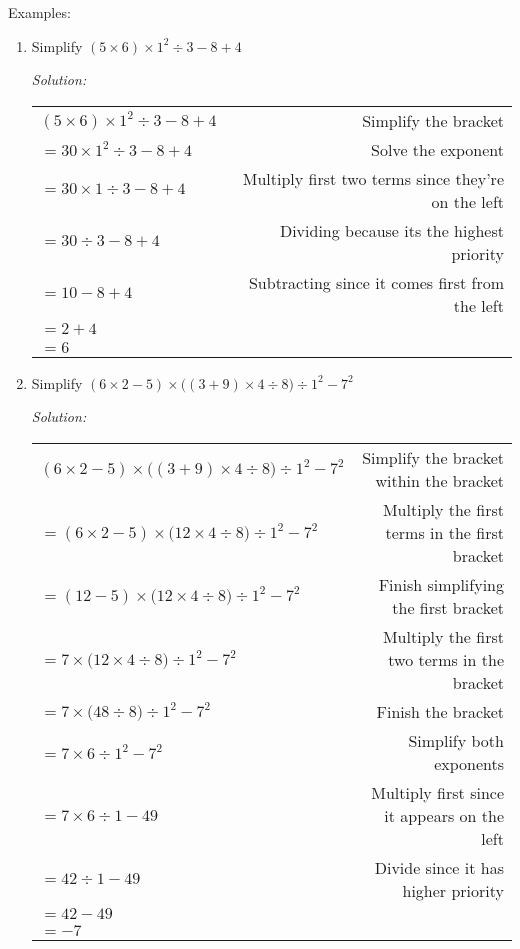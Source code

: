 \documentclass[16pt]{article}
\theoremstyle{remark}
\begin{document}
Examples:
\begin{enumerate}
\item Simplify $(5\times 6)\times1^2 \div3-8+4$
\begin{mdframed}[style=TheoremFrame]
\textit{Solution:}
\begin{center}
\begin{tabular}{l r}
$(5\times 6)\times 1^2 \div 3-8+4$ &  Simplify the bracket\\
$ = 30 \times 1^2 \div 3-8+4$ &  Solve the exponent\\
$= 30 \times1 \div 3-8+4$ &  Multiply first two terms since they're on the left\\
$= 30 \div 3 -8+4$ &  Dividing because its the highest priority \\
$= 10 - 8 + 4$ & Subtracting since it comes first from the left\\
$= 2+4$ & \\
$= 6$ &\\
\end{tabular}
\end{center}

\end{mdframed}
\item Simplify $(6\times 2 - 5) \times \big((3+9)\times 4 \div 8 \big) \div 1^2-7^2$
\begin{mdframed}[style=TheoremFrame]
\textit{Solution:}
\begin{center}
\begin{tabular}{l r}
$(6\times 2 - 5) \times \big((3+9)\times 4 \div 8 \big) \div 1^2-7^2$ & Simplify the bracket within the bracket\\
$=(6\times 2 - 5) \times \big(12\times 4 \div 8 \big) \div 1^2-7^2$ & Multiply the first terms in the first bracket\\
$= (12 - 5) \times \big(12\times 4 \div 8 \big) \div 1^2-7^2$ & Finish simplifying the first bracket\\
$= 7 \times \big(12\times 4 \div 8 \big) \div 1^2-7^2$ & Multiply the first two terms in the bracket\\
$= 7 \times \big(48 \div 8 \big) \div 1^2-7^2$ & Finish the bracket\\
$= 7 \times 6 \div 1^2-7^2$ & Simplify both exponents\\
$= 7 \times 6 \div 1-49$ & Multiply first since it appears on the left\\
$= 42 \div 1-49$ & Divide since it has higher priority\\
$= 42-49$ & \\
$= -7$ & \\
\end{tabular}
\end{center}


\end{mdframed}
\end{enumerate}
\end{document}
